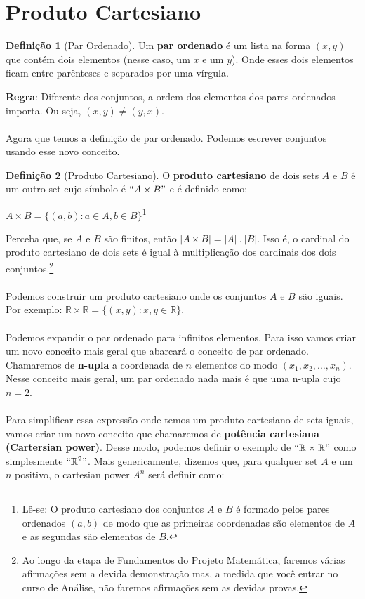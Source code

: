 \documentclass[a4paper,11pt]{book}
\theoremstyle{definition}
\newtheorem{definition}{Definição}[section]
\begin{document}
\section{Produto Cartesiano}
\begin{definition}[Par Ordenado]
Um \textbf{par ordenado} é um lista na forma $(x, y)$ que contém dois elementos (nesse caso, um $x$ e um $y$). Onde esses dois elementos ficam entre parênteses e separados por uma vírgula.
\end{definition}

\textbf{Regra}: Diferente dos conjuntos, a ordem dos elementos dos pares ordenados importa. Ou seja, $(x,y) \neq (y,x)$. 
\\
\\
Agora que temos a definição de par ordenado. Podemos escrever conjuntos usando esse novo conceito.

\begin{definition}[Produto Cartesiano]
O \textbf{produto cartesiano} de dois sets $A$ e $B$ é um outro set cujo símbolo é $``A \times B"$ e é definido como:
\begin{center}
$A \times B = \{ (a,b) : a \in A, b \in B \}$\footnote{Lê-se: O produto cartesiano dos conjuntos $A$ e $B$ é formado pelos pares ordenados $(a,b)$ de modo que as primeiras coordenadas são elementos de $A$ e as segundas são elementos de $B$.}
\end{center}
\end{definition}

Perceba que, se $A$ e $B$ são finitos, então $| A \times B | = |A| \ . \ |B|$. Isso é, o cardinal do produto cartesiano de dois sets é igual à multiplicação dos cardinais dos dois conjuntos.\footnote{Ao longo da etapa de Fundamentos do Projeto Matemática, faremos várias afirmações sem a devida demonstração mas, a medida que você entrar no curso de Análise, não faremos afirmações sem as devidas provas.}
\\
\\
Podemos construir um produto cartesiano onde os conjuntos $A$ e $B$ são iguais. Por exemplo: $\mathbb{R} \times \mathbb{R} = \{ (x,y) : x,y \in \mathbb{R} \}$.
\\
\\
Podemos expandir o par ordenado para infinitos elementos. Para isso vamos criar um novo conceito mais geral que abarcará o conceito de par ordenado. Chamaremos de \textbf{n-upla} a coordenada de $n$ elementos do modo $(x_1, x_2, \dots, x_n)$. Nesse conceito mais geral, um par ordenado nada mais é que uma n-upla cujo $n = 2$.
\\
\\
Para simplificar essa expressão onde temos um produto cartesiano de sets iguais, vamos criar um novo conceito que chamaremos de \textbf{potência cartesiana (Cartersian power)}. Desse modo, podemos definir o exemplo de $``\mathbb{R} \times \mathbb{R}"$ como simplesmente $``\mathbb{R}^2"$. Mais genericamente, dizemos que, para qualquer set $A$ e um $n$ positivo, o cartesian power $A^n$ será definir como:
\end{document}
